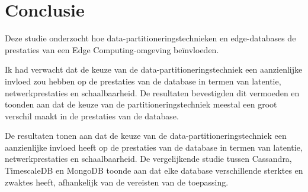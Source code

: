 
\chapter{Conclusie}%
\label{ch:conclusie}

Deze studie onderzocht hoe data-partitioneringstechnieken en edge-databases de prestaties van een Edge Computing-omgeving beïnvloeden.

Ik had verwacht dat de keuze van de data-partitioneringstechniek een aanzienlijke invloed zou hebben op de prestaties van de database in termen van latentie, netwerkprestaties en schaalbaarheid. De resultaten bevestigden dit vermoeden en toonden aan dat de keuze van de partitioneringstechniek meestal een groot verschil maakt in de prestaties van de database.

De resultaten tonen aan dat de keuze van de data-partitioneringstechniek een aanzienlijke invloed heeft op de prestaties van de database in termen van latentie, netwerkprestaties en schaalbaarheid. De vergelijkende studie tussen Cassandra, TimescaleDB en MongoDB toonde aan dat elke database verschillende sterktes en zwaktes heeft, afhankelijk van de vereisten van de toepassing.


